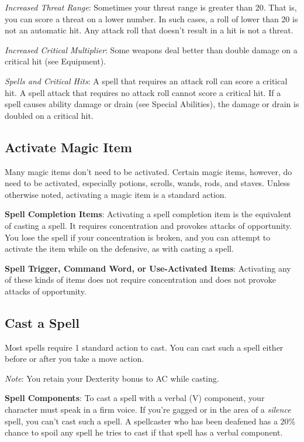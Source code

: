 \textit{Increased Threat Range}: Sometimes your threat range is greater than 20. That is, you can score a threat on a lower number. In such cases, a roll of lower than 20 is not an automatic hit. Any attack roll that doesn't result in a hit is not a threat.
				
\textit{Increased Critical Multiplier}: Some weapons deal better than double damage on a critical hit (see Equipment).
				
\textit{Spells and Critical Hits}: A spell that requires an attack roll can score a critical hit. A spell attack that requires no attack roll cannot score a critical hit. If a spell causes ability damage or drain (see Special Abilities), the damage or drain is doubled on a critical hit.
				
\subsection{Activate Magic Item}

				
Many magic items don't need to be activated. Certain magic items, however, do need to be activated, especially potions, scrolls, wands, rods, and staves. Unless otherwise noted, activating a magic item is a standard action.
				
\textbf{Spell Completion Items}: Activating a spell completion item is the equivalent of casting a spell. It requires concentration and provokes attacks of opportunity. You lose the spell if your concentration is broken, and you can attempt to activate the item while on the defensive, as with casting a spell.
				
\textbf{Spell Trigger, Command Word, or Use-Activated Items}: Activating any of these kinds of items does not require concentration and does not provoke attacks of opportunity.
				
\subsection{Cast a Spell}

				
Most spells require 1 standard action to cast. You can cast such a spell either before or after you take a move action. 
				
\textit{Note}: You retain your Dexterity bonus to AC while casting.
				
\textbf{Spell Components}: To cast a spell with a verbal (V) component, your character must speak in a firm voice. If you're gagged or in the area of a \textit{silence }spell, you can't cast such a spell. A spellcaster who has been deafened has a 20\% chance to spoil any spell he tries to cast if that spell has a verbal component.
				
